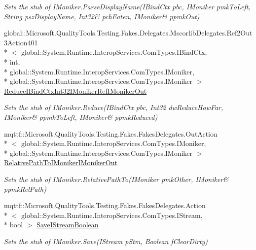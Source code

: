 \begin{DoxyCompactItemize}
\begin{DoxyCompactList}\small\item\em Sets the stub of I\-Moniker.\-Parse\-Display\-Name(I\-Bind\-Ctx pbc, I\-Moniker pmk\-To\-Left, String psz\-Display\-Name, Int32\& pch\-Eaten, I\-Moniker\& ppmk\-Out)\end{DoxyCompactList}\item 
global\-::\-Microsoft.\-Quality\-Tools.\-Testing.\-Fakes.\-Delegates.\-Mscorlib\-Delegates.\-Ref2\-Out3\-Action401\\*
$<$ global\-::\-System.\-Runtime.\-Interop\-Services.\-Com\-Types.\-I\-Bind\-Ctx, \\*
int, \\*
global\-::\-System.\-Runtime.\-Interop\-Services.\-Com\-Types.\-I\-Moniker, \\*
global\-::\-System.\-Runtime.\-Interop\-Services.\-Com\-Types.\-I\-Moniker $>$ \hyperlink{class_system_1_1_runtime_1_1_interop_services_1_1_com_types_1_1_fakes_1_1_stub_i_moniker_af7d7fa515c33d4cb15c54dc72508a8e4}{Reduce\-I\-Bind\-Ctx\-Int32\-I\-Moniker\-Ref\-I\-Moniker\-Out}
\begin{DoxyCompactList}\small\item\em Sets the stub of I\-Moniker.\-Reduce(I\-Bind\-Ctx pbc, Int32 dw\-Reduce\-How\-Far, I\-Moniker\& ppmk\-To\-Left, I\-Moniker\& ppmk\-Reduced)\end{DoxyCompactList}\item 
mqttf\-::\-Microsoft.\-Quality\-Tools.\-Testing.\-Fakes.\-Fakes\-Delegates.\-Out\-Action\\*
$<$ global\-::\-System.\-Runtime.\-Interop\-Services.\-Com\-Types.\-I\-Moniker, \\*
global\-::\-System.\-Runtime.\-Interop\-Services.\-Com\-Types.\-I\-Moniker $>$ \hyperlink{class_system_1_1_runtime_1_1_interop_services_1_1_com_types_1_1_fakes_1_1_stub_i_moniker_ac69cc228d5291f6a26628d70c037adeb}{Relative\-Path\-To\-I\-Moniker\-I\-Moniker\-Out}
\begin{DoxyCompactList}\small\item\em Sets the stub of I\-Moniker.\-Relative\-Path\-To(I\-Moniker pmk\-Other, I\-Moniker\& ppmk\-Rel\-Path)\end{DoxyCompactList}\item 
mqttf\-::\-Microsoft.\-Quality\-Tools.\-Testing.\-Fakes.\-Fakes\-Delegates.\-Action\\*
$<$ global\-::\-System.\-Runtime.\-Interop\-Services.\-Com\-Types.\-I\-Stream, \\*
bool $>$ \hyperlink{class_system_1_1_runtime_1_1_interop_services_1_1_com_types_1_1_fakes_1_1_stub_i_moniker_a666339be87c22a7b100cfa3934779d3a}{Save\-I\-Stream\-Boolean}
\begin{DoxyCompactList}\small\item\em Sets the stub of I\-Moniker.\-Save(\-I\-Stream p\-Stm, Boolean f\-Clear\-Dirty)\end{DoxyCompactList}\end{DoxyCompactItemize}


